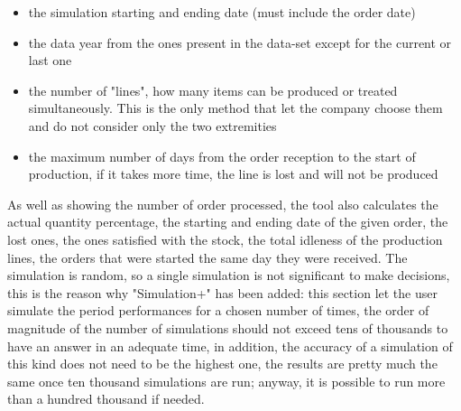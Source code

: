 \documentclass[a4paper,12pt]{article}
\begin{document}
\begin{itemize}
	\item the simulation starting and ending date (must include the order date)
	\item the data year from the ones present in the data-set except for the current or last one
	\item the number of "lines", how many items can be produced or treated simultaneously. This is the only method that let the company choose them and do not consider only the two extremities
	\item the maximum number of days from the order reception to the start of production, if it takes more time, the line is lost and will not be produced
\end{itemize}
As well as showing the number of order processed, the tool also calculates the actual quantity percentage, the starting and ending date of the given order, the lost ones, the ones satisfied with the stock, the total idleness of the production lines, the orders that were started the same day they were received. The simulation is random, so a single simulation is not significant to make decisions, this is the reason why "Simulation+" has been added: this section let the user simulate the period performances for a chosen number of times, the order of magnitude of the number of simulations should not exceed tens of thousands to have an answer in an adequate time, in addition, the accuracy of a simulation of this kind does not need to be the highest one, the results are pretty much the same once ten thousand simulations are run; anyway, it is possible to run more than a hundred thousand if needed.


\newpage
\end{document}
